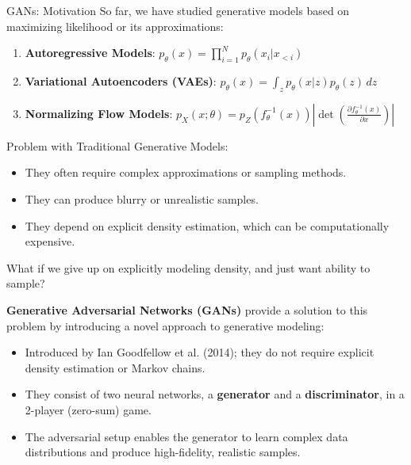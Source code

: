 \begin{frame}[allowframebreaks]{GANs: Motivation}
So far, we have studied generative models based on maximizing likelihood or its approximations:
\begin{enumerate}
    \item \textbf{Autoregressive Models}: $p_\theta(x) = \prod^N_{i=1} p_\theta(x_i|x_{<i})$
    \item \textbf{Variational Autoencoders (VAEs)}: $p_\theta(x) = \int_z p_\theta(x|z) p_\theta(z) \, dz$
    \item \textbf{Normalizing Flow Models}: $p_X(x;\theta) = p_Z(f_\theta^{-1}(x)) \left | \det \left( \frac{\partial f_\theta^{-1}(x)}{\partial x} \right )\right |$
\end{enumerate}

\begin{block}{Problem with Traditional Generative Models:}
    \begin{itemize}
        \item They often require complex approximations or sampling methods.
        \item They can produce blurry or unrealistic samples.
        \item They depend on explicit density estimation, which can be computationally expensive.
    \end{itemize}
\end{block}

What if we give up on explicitly modeling density, and just want
ability to sample?

\framebreak

\textbf{Generative Adversarial Networks (GANs)} provide a solution to this problem by introducing a novel approach to generative modeling:
\begin{itemize}
    \item Introduced by Ian Goodfellow et al. (2014); they do not require explicit density estimation or Markov chains.
    \item They consist of two neural networks, a \textbf{generator} and a \textbf{discriminator}, in a 2-player (zero-sum) game.
    \item The adversarial setup enables the generator to learn complex data distributions and produce high-fidelity, realistic samples.
\end{itemize}

\end{frame}

